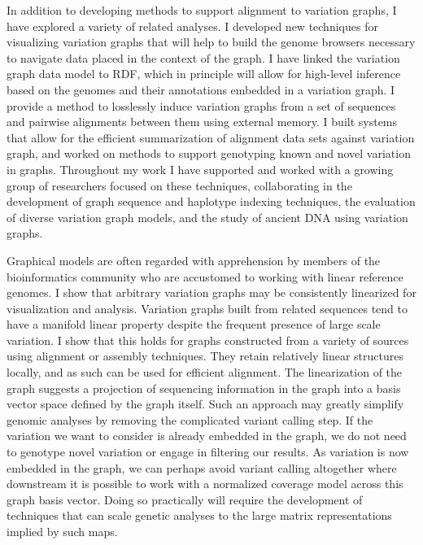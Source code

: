 In addition to developing methods to support alignment to variation graphs, I have explored a variety of related analyses.
I developed new techniques for visualizing variation graphs that will help to build the genome browsers necessary to navigate data placed in the context of the graph.
I have linked the variation graph data model to RDF, which in principle will allow for high-level inference based on the genomes and their annotations embedded in a variation graph. 
I provide a method to losslessly induce variation graphs from a set of sequences and pairwise alignments between them using external memory.
I built systems that allow for the efficient summarization of alignment data sets against variation graph, and worked on methods to support genotyping known and novel variation in graphs.
Throughout my work I have supported and worked with a growing group of researchers focused on these techniques, collaborating in the development of graph sequence and haplotype indexing techniques, the evaluation of diverse variation graph models, and the study of ancient DNA using variation graphs.

Graphical models are often regarded with apprehension by members of the bioinformatics community who are accustomed to working with linear reference genomes.
I show that arbitrary variation graphs may be consistently linearized for visualization and analysis.
Variation graphs built from related sequences tend to have a manifold linear property despite the frequent presence of large scale variation.
I show that this holds for graphs constructed from a variety of sources using alignment or assembly techniques.
They retain relatively linear structures locally, and as such can be used for efficient alignment.
The linearization of the graph suggests a projection of sequencing information in the graph into a basis vector space defined by the graph itself.
Such an approach may greatly simplify genomic analyses by removing the complicated variant calling step.
If the variation we want to consider is already embedded in the graph, we do not need to genotype novel variation or engage in filtering our results.
As variation is now embedded in the graph, we can perhaps avoid variant calling altogether where downstream it is possible to work with a normalized coverage model across this graph basis vector.
Doing so practically will require the development of techniques that can scale genetic analyses to the large matrix representations implied by such maps.

